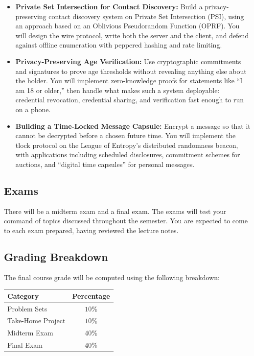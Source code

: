 \documentclass[10pt,a4paper,american]{exam}
\begin{document}
\begin{itemize}
	\item \textbf{Private Set Intersection for Contact Discovery:} Build a privacy-preserving contact discovery system on Private Set Intersection (PSI), using an approach based on an Oblivious Pseudorandom Function (OPRF). You will design the wire protocol, write both the server and the client, and defend against offline enumeration with peppered hashing and rate limiting.
	\item \textbf{Privacy-Preserving Age Verification:} Use cryptographic commitments and signatures to prove age thresholds without revealing anything else about the holder. You will implement zero-knowledge proofs for statements like ``I am 18 or older,'' then handle what makes such a system deployable: credential revocation, credential sharing, and verification fast enough to run on a phone.
	\item \textbf{Building a Time-Locked Message Capsule:} Encrypt a message so that it cannot be decrypted before a chosen future time. You will implement the tlock protocol on the League of Entropy's distributed randomness beacon, with applications including scheduled disclosures, commitment schemes for auctions, and ``digital time capsules'' for personal messages.
\end{itemize}

\subsection{Exams}
There will be a midterm exam and a final exam. The exams will test your command of topics discussed throughout the semester. You are expected to come to each exam prepared, having reviewed the lecture notes.

\subsection{Grading Breakdown}
The final course grade will be computed using the following breakdown:

\begin{center}
	\renewcommand{\arraystretch}{2}
	\begin{tabular}{|p{2.5in}|c|}
		\hline
		\textbf{Category} & \textbf{Percentage} \\
		\hline
		Problem Sets      & $10\%$              \\
		\hline
		Take-Home Project & $10\%$              \\
		\hline
		Midterm Exam      & $40\%$              \\
		\hline
		Final Exam        & $40\%$              \\
		\hline
	\end{tabular}
\end{center}
\end{document}
